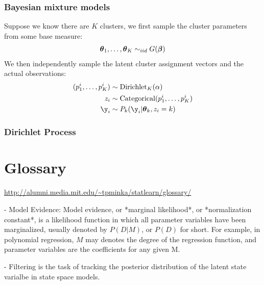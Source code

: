 \documentclass{book}
\begin{document}
\subsection{Bayesian mixture models}
Suppose we know there are $K$ clusters, we first sample the cluster parameters from some base measure:
\begin{align}
{\boldsymbol{\theta}}_1, \dots, {\boldsymbol{\theta}}_K \sim_{iid} G({\boldsymbol{\beta}})
\end{align}
We then independently sample the latent cluster assignment vectors and the actual observations:
\begin{align}
(p_1^i, \dots, p_K^i) &\sim \text{Dirichlet}_K(\alpha)\\
z_i &\sim \text{Categorical}(p_1^i, \dots, p_K^i)\\
\y_i &\sim P_k(\y_i | \btheta_k, z_i = k)
\end{align}

\subsection{Dirichlet Process}

\appendix
\chapter{Glossary}
\url{http://alumni.media.mit.edu/~tpminka/statlearn/glossary/}


- Model Evidence: Model evidence, or *marginal likelihood*, or *normalization constant*, is a likelihood function in which all parameter variables have been marginalized, usually denoted by $P(D|M)$, or $P(D)$ for short. For example, in polynomial regression, $M$ may denotes the degree of the regression function, and parameter variables are the coefficients for any given M.

- Filtering is the task of tracking the posterior distribution of the latent state varialbe in state space models.
\end{document}
